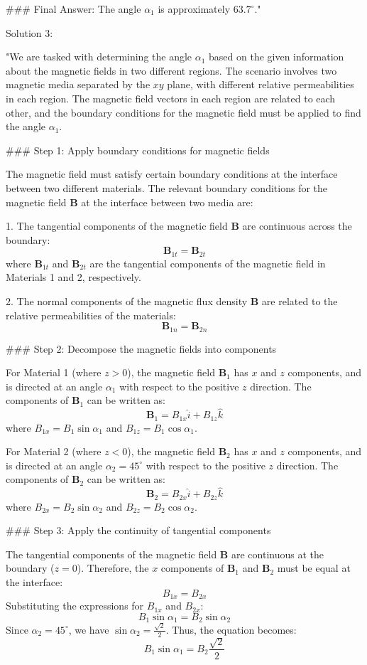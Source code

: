 ### Final Answer:
The angle $\alpha_1$ is approximately $63.7^\circ$."

Solution 3: 

"We are tasked with determining the angle $\alpha_1$ based on the given information about the magnetic fields in two different regions. The scenario involves two magnetic media separated by the $xy$ plane, with different relative permeabilities in each region. The magnetic field vectors in each region are related to each other, and the boundary conditions for the magnetic field must be applied to find the angle $\alpha_1$.

### Step 1: Apply boundary conditions for magnetic fields

The magnetic field must satisfy certain boundary conditions at the interface between two different materials. The relevant boundary conditions for the magnetic field $\mathbf{B}$ at the interface between two media are:

1. The tangential components of the magnetic field $\mathbf{B}$ are continuous across the boundary:
\[
\mathbf{B}_{1t} = \mathbf{B}_{2t}
\]
where $\mathbf{B}_{1t}$ and $\mathbf{B}_{2t}$ are the tangential components of the magnetic field in Materials 1 and 2, respectively.

2. The normal components of the magnetic flux density $\mathbf{B}$ are related to the relative permeabilities of the materials:
\[
\mathbf{B}_{1n} = \mathbf{B}_{2n}
\]

### Step 2: Decompose the magnetic fields into components

For Material 1 (where $z > 0$), the magnetic field $\mathbf{B}_1$ has $x$ and $z$ components, and is directed at an angle $\alpha_1$ with respect to the positive $z$ direction. The components of $\mathbf{B}_1$ can be written as:
\[
\mathbf{B}_1 = B_{1x} \hat{i} + B_{1z} \hat{k}
\]
where $B_{1x} = B_1 \sin \alpha_1$ and $B_{1z} = B_1 \cos \alpha_1$.

For Material 2 (where $z < 0$), the magnetic field $\mathbf{B}_2$ has $x$ and $z$ components, and is directed at an angle $\alpha_2 = 45^\circ$ with respect to the positive $z$ direction. The components of $\mathbf{B}_2$ can be written as:
\[
\mathbf{B}_2 = B_{2x} \hat{i} + B_{2z} \hat{k}
\]
where $B_{2x} = B_2 \sin \alpha_2$ and $B_{2z} = B_2 \cos \alpha_2$.

### Step 3: Apply the continuity of tangential components

The tangential components of the magnetic field $\mathbf{B}$ are continuous at the boundary ($z = 0$). Therefore, the $x$ components of $\mathbf{B}_1$ and $\mathbf{B}_2$ must be equal at the interface:
\[
B_{1x} = B_{2x}
\]
Substituting the expressions for $B_{1x}$ and $B_{2x}$:
\[
B_1 \sin \alpha_1 = B_2 \sin \alpha_2
\]
Since $\alpha_2 = 45^\circ$, we have $\sin \alpha_2 = \frac{\sqrt{2}}{2}$. Thus, the equation becomes:
\[
B_1 \sin \alpha_1 = B_2 \frac{\sqrt{2}}{2}
\]

